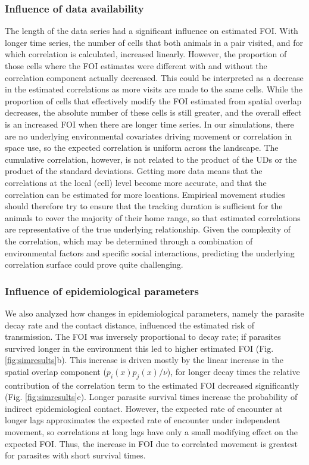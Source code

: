 \documentclass[letterpaper]{article}
\begin{document}
\subsubsection*{Influence of data availability}
The length of the data series had a significant influence on estimated FOI. With longer time series, the number of cells that both animals in a pair visited, and for which correlation is calculated, increased linearly. However, the proportion of those cells where the FOI estimates were different with and without the correlation component actually decreased. This could be interpreted as a decrease in the estimated correlations as more visits are made to the same cells. 
While the proportion of cells that effectively modify the FOI estimated from spatial overlap decreases, the absolute number of these cells is still greater, and the overall effect is an increased FOI when there are longer time series. In our simulations, there are no underlying environmental covariates driving movement or correlation in space use, so the expected correlation is uniform across the landscape. The cumulative correlation, however, is not related to the product of the UDs or the product of the standard deviations. 
Getting more data means that the correlations at the local (cell) level become more accurate, and that the correlation can be estimated for more locations. Empirical movement studies should therefore try to ensure that the tracking duration is sufficient for the animals to cover the majority of their home range, so that estimated correlations are representative of the true underlying relationship. Given the complexity of the correlation, which may be determined through a combination of environmental factors and specific social interactions, predicting the underlying correlation surface could prove quite challenging. 

\subsubsection*{Influence of epidemiological parameters}

We also analyzed how changes in epidemiological parameters, namely the parasite decay rate and the contact distance, influenced the estimated risk of transmission. 
The FOI was inversely proportional to decay rate; if parasites survived longer in the environment this led to higher estimated FOI (Fig. \ref{fig:simresults}b). This increase is driven mostly by the linear increase in the spatial overlap component ($p_i(x)p_j(x)/\nu$), for longer decay times the relative contribution of the correlation term to the estimated FOI decreased significantly (Fig. \ref{fig:simresults}e). Longer parasite survival times increase the probability of indirect epidemiological contact. However, the expected rate of encounter at longer lags approximates the expected rate of encounter under independent movement, so correlations at long lags have only a small modifying effect on the expected FOI. Thus, the increase in FOI due to correlated movement is greatest for parasites with short survival times. 
\end{document}
